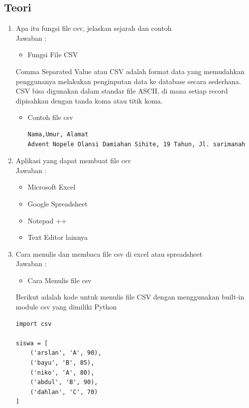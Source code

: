 \subsection{Teori}
\begin{enumerate}

\item Apa itu fungsi file csv, jelaskan sejarah dan contoh\\
Jawaban :

\begin{itemize}
\item Fungsi File CSV
\end{itemize}

Comma Separated Value atau CSV adalah format data yang memudahkan penggunanya melakukan penginputan data ke database secara sederhana. CSV bisa digunakan dalam standar file ASCII, di mana setiap record dipisahkan dengan tanda koma atau titik koma.


\begin{itemize}
\item Contoh file csv
\begin{verbatim}
Nama,Umur, Alamat
Advent Nopele Olansi Damiahan Sihite, 19 Tahun, Jl. sarimanah
\end{verbatim}
\end{itemize}

\item Aplikasi yang dapat membuat file csv\\
Jawaban :

\begin{itemize}
\item Microsoft Excel
\item Google Spreadsheet
\item Notepad ++
\item Text Editor lainnya
\end{itemize}

\item  Cara menulis dan membaca file csv di excel atau spreadsheet\\
Jawaban :

\begin{itemize}
\item Cara Menulis file csv
\end{itemize}
Berikut adalah kode untuk menulis file CSV dengan menggunakan built-in module csv yang dimiliki Python

\begin{verbatim}
import csv

siswa = [
    ('arslan', 'A', 90),
    ('bayu', 'B', 85),
    ('niko', 'A', 80),
    ('abdul', 'B', 90),
    ('dahlan', 'C', 70)
]


\end{verbatim}
\end{enumerate}
